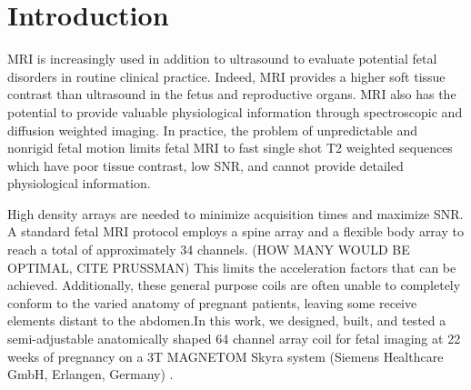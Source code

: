\chapter{Introduction}
MRI is increasingly used in addition to ultrasound to evaluate potential fetal disorders in routine clinical practice.
Indeed, MRI provides a higher soft tissue contrast than ultrasound in the fetus and reproductive organs. MRI also has
the potential to provide valuable physiological information through spectroscopic and diffusion weighted imaging. In
practice, the problem of unpredictable and nonrigid fetal motion limits fetal MRI to fast single shot T2 weighted
sequences which have poor tissue contrast, low SNR, and cannot provide detailed physiological information.

High density arrays are needed to minimize acquisition times and maximize SNR. A standard fetal MRI protocol employs a
spine array and a flexible body array to reach a total of approximately 34 channels. (HOW MANY WOULD BE OPTIMAL, CITE
PRUSSMAN) This limits the acceleration factors that can be achieved. Additionally, these general purpose coils are often
unable to completely conform to the varied anatomy of pregnant patients, leaving some receive elements distant to the
abdomen.In this work, we designed, built, and tested a semi-adjustable anatomically shaped 64 channel array coil for
fetal imaging at 22 weeks of pregnancy on a 3T MAGNETOM Skyra system (Siemens Healthcare GmbH, Erlangen, Germany) .
